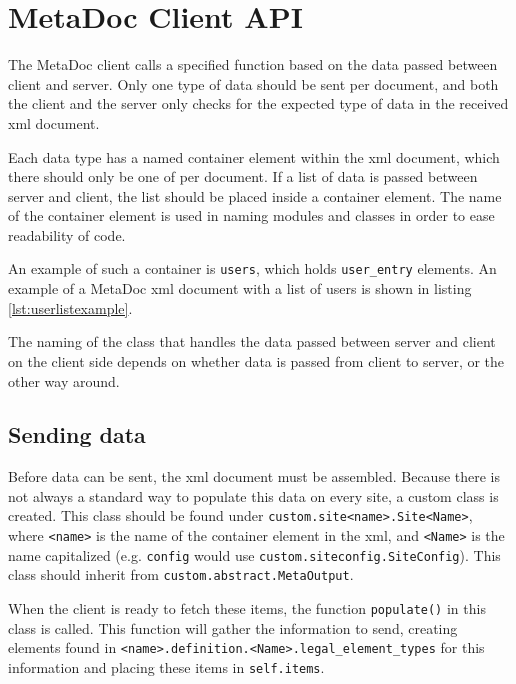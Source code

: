 \newpage
\section{MetaDoc Client API}
\label{sec:client_api}

The MetaDoc client calls a specified function based on the data passed between
client and server. Only one type of data should be sent per document, and both
the client and the server only checks for the expected type of data in the
received \gls{xml} document. 

Each data type has a named container element within the \gls{xml} document,
which there should only be one of per document. If a list of data is passed
between server and client, the list should be placed inside a container
element. The name of the container element is used in naming modules and
classes in order to ease readability of code. 

An example of such a container is \texttt{users}, which holds
\texttt{user\_entry} elements. An example of a MetaDoc \gls{xml} document with
a list of users is shown in listing \ref{lst:userlistexample}.


The naming of the class that handles the data passed between server and client
on the client side depends on whether data is passed from client to server, or
the other way around. 

\subsection{Sending data}
\label{sec:customizing_client_send}
Before data can be sent, the \gls{xml} document must be assembled. Because
there is not always a standard way to populate this data on every site, a
custom class is created. This class should be found under
\texttt{custom.site<name>.Site<Name>}, where \texttt{<name>} is the name of the
container element in the \gls{xml}, and \texttt{<Name>} is the name capitalized
(e.g.  \texttt{config} would use \texttt{custom.siteconfig.SiteConfig}). This
class should inherit from \texttt{custom.abstract.MetaOutput}. 

When the client is ready to fetch these items, the function \texttt{populate()}
in this class is called. This function will gather the information to send,
creating elements found in
\texttt{<name>.definition.<Name>.legal\_element\_types} for this information
and placing these items in \texttt{self.items}. 

